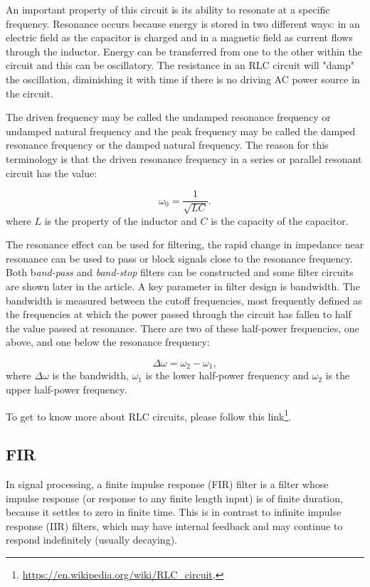 \documentclass[12pt]{article}
\theoremstyle{plain}
\begin{document}
An important property of this circuit is its ability to resonate at a specific frequency. Resonance occurs because energy is stored in two different ways: in an electric field as the capacitor is charged and in a magnetic field as current flows through the inductor. Energy can be transferred from one to the other within the circuit and this can be oscillatory. The resistance in an RLC circuit will "damp" the oscillation, diminishing it with time if there is no driving AC power source in the circuit. 

The driven frequency may be called the undamped resonance frequency or undamped natural frequency and the peak frequency may be called the damped resonance frequency or the damped natural frequency. The reason for this terminology is that the driven resonance frequency in a series or parallel resonant circuit has the value:

\begin{equation}
\omega_0 = \frac{1}{\sqrt{LC}}.
\end{equation}
where $L$ is the property of the inductor and $C$ is the capacity of the capacitor. 

The resonance effect can be used for filtering, the rapid change in impedance near resonance can be used to pass or block signals close to the resonance frequency. Both b\textit{and-pass} and \textit{band-stop} filters can be constructed and some filter circuits are shown later in the article. A key parameter in filter design is bandwidth. The bandwidth is measured between the cutoff frequencies, most frequently defined as the frequencies at which the power passed through the circuit has fallen to half the value passed at resonance. There are two of these half-power frequencies, one above, and one below the resonance frequency:

\begin{equation}
\Delta \omega = \omega_2 - \omega_1,
\end{equation}
where $\Delta \omega$ is the bandwidth, $\omega_1$ is the lower half-power frequency and $\omega_2$ is the upper half-power frequency.

To get to know more about RLC circuits, please follow this link\footnote{\url{https://en.wikipedia.org/wiki/RLC_circuit},}.

\subsection{FIR}

In signal processing, a finite impulse response (FIR) filter is a filter whose impulse response (or response to any finite length input) is of finite duration, because it settles to zero in finite time. This is in contrast to infinite impulse response (IIR) filters, which may have internal feedback and may continue to respond indefinitely (usually decaying).
\end{document}
